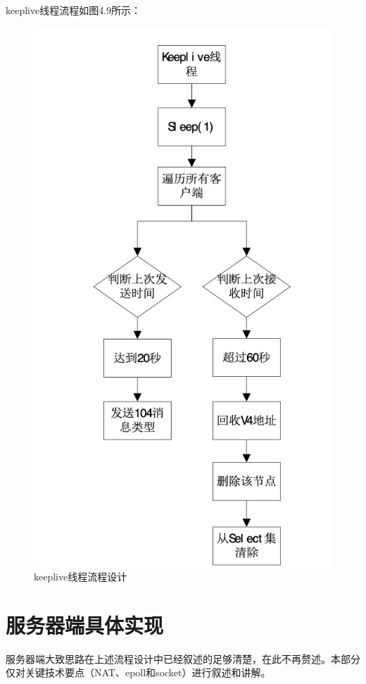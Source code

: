keeplive线程流程如图4.9所示：
\begin{figure}[!ht]
	\begin{center}
	\includegraphics[scale=.58]{server_keep.png}
	\end{center}
	\caption{keeplive线程流程设计}
	\label{figure:keeplive线程流程设计}
\end{figure}

\section{服务器端具体实现}
服务器端大致思路在上述流程设计中已经叙述的足够清楚，在此不再赘述。本部分仅对关键技术要点（NAT、epoll和socket）进行叙述和讲解。
